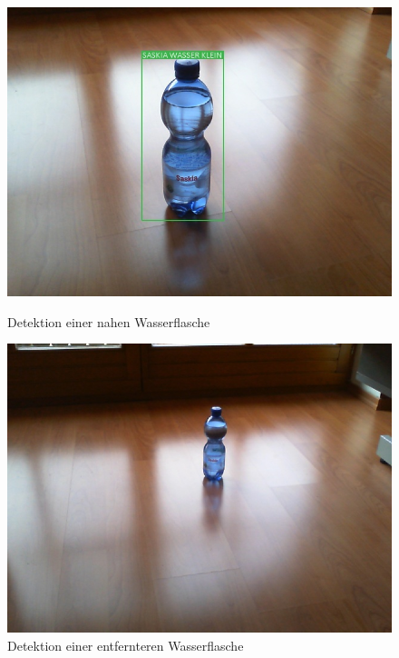 \begin{figure}
	\begin{minipage}[b]{.45\linewidth} %
		\includegraphics[width=\linewidth]{Bilder/near.jpeg}
		\caption[Detektion einer nahen Wasserflasche]{Detektion einer nahen Wasserflasche}
		\label{near}
	\end{minipage}
	\hspace{.1\linewidth}%
	\begin{minipage}[b]{.45\linewidth} %
		\includegraphics[width=\linewidth]{Bilder/far.jpeg}
		\caption[Detektion einer entfernteren Wasserflasche]{Detektion einer entfernteren Wasserflasche}
		\label{far}
	\end{minipage}
\end{figure}


